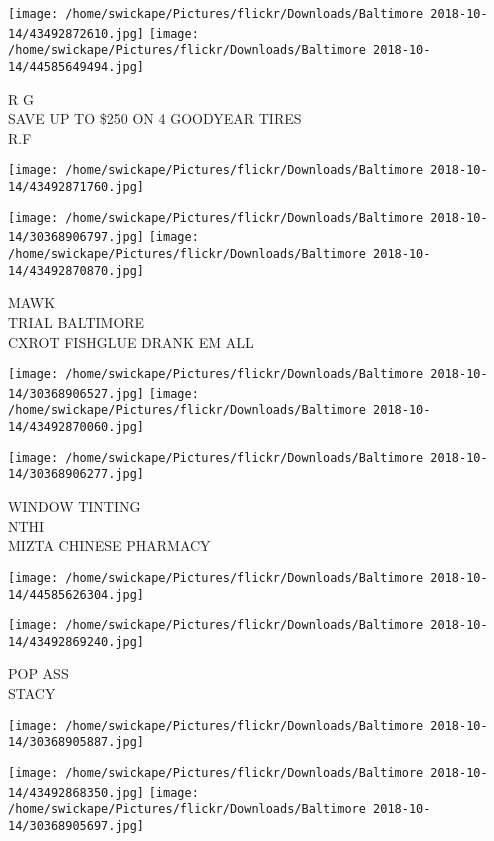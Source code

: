 \documentclass[10pt,letterpaper]{article}
\begin{document}
\vspace{0.25in}
\texttt{[image: /home/swickape/Pictures/flickr/Downloads/Baltimore 2018-10-14/43492872610.jpg]}
\texttt{[image: /home/swickape/Pictures/flickr/Downloads/Baltimore 2018-10-14/44585649494.jpg]}

R G\\
SAVE UP TO \$250 ON 4 GOODYEAR TIRES\\
R.F
\pagebreak

\texttt{[image: /home/swickape/Pictures/flickr/Downloads/Baltimore 2018-10-14/43492871760.jpg]}

\vspace{0.25in}
\texttt{[image: /home/swickape/Pictures/flickr/Downloads/Baltimore 2018-10-14/30368906797.jpg]}
\texttt{[image: /home/swickape/Pictures/flickr/Downloads/Baltimore 2018-10-14/43492870870.jpg]}

MAWK\\
TRIAL BALTIMORE\\
CXROT FISHGLUE DRANK EM ALL
\pagebreak

\texttt{[image: /home/swickape/Pictures/flickr/Downloads/Baltimore 2018-10-14/30368906527.jpg]}
\texttt{[image: /home/swickape/Pictures/flickr/Downloads/Baltimore 2018-10-14/43492870060.jpg]}

\vspace{0.25in}
\texttt{[image: /home/swickape/Pictures/flickr/Downloads/Baltimore 2018-10-14/30368906277.jpg]}

WINDOW TINTING\\
NTHI\\
MIZTA CHINESE PHARMACY
\pagebreak

\texttt{[image: /home/swickape/Pictures/flickr/Downloads/Baltimore 2018-10-14/44585626304.jpg]}

\vspace{0.25in}
\texttt{[image: /home/swickape/Pictures/flickr/Downloads/Baltimore 2018-10-14/43492869240.jpg]}

POP ASS\\
STACY
\pagebreak

\texttt{[image: /home/swickape/Pictures/flickr/Downloads/Baltimore 2018-10-14/30368905887.jpg]}

\vspace{0.25in}
\texttt{[image: /home/swickape/Pictures/flickr/Downloads/Baltimore 2018-10-14/43492868350.jpg]}
\texttt{[image: /home/swickape/Pictures/flickr/Downloads/Baltimore 2018-10-14/30368905697.jpg]}
\end{document}
